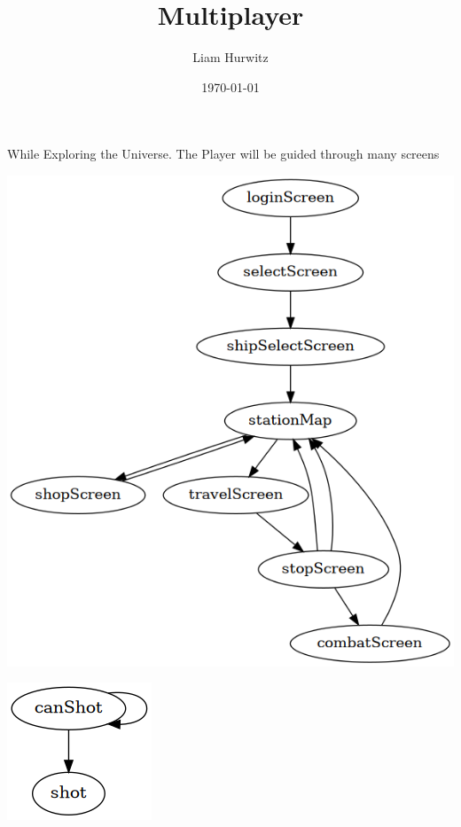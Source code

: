 \documentclass[11pt]{article}
\author{Liam Hurwitz}
\date{\today}
\title{Multiplayer}
\begin{document}
\maketitle
\tableofcontents

While Exploring the Universe. The Player will be guided through many screens
\begin{center}
\includegraphics[width=.9\linewidth]{multi1.png}
\end{center}


\begin{center}
\includegraphics[width=.9\linewidth]{multiFight.png}
\end{center}
\end{document}
